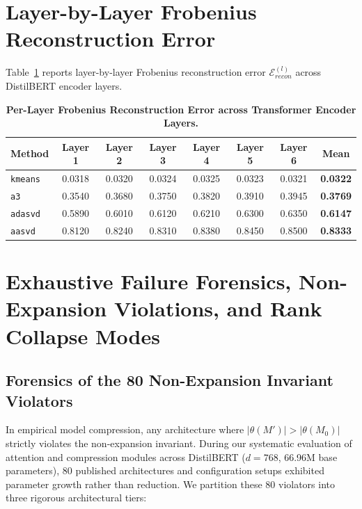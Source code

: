 \documentclass{article}
\begin{document}
\section{Layer-by-Layer Frobenius Reconstruction Error}
\label{app:recon_error}
Table~\ref{tab:layer_recon} reports layer-by-layer Frobenius reconstruction error $\mathcal{E}_{recon}^{(l)}$ across DistilBERT encoder layers.
\begin{table}[ht]
\centering
\footnotesize
\setlength{\tabcolsep}{5pt}
\caption{\textbf{Per-Layer Frobenius Reconstruction Error across Transformer Encoder Layers.}}
\label{tab:layer_recon}
\begin{tabular}{lcccccc|c}
\toprule
\textbf{Method} & \textbf{Layer 1} & \textbf{Layer 2} & \textbf{Layer 3} & \textbf{Layer 4} & \textbf{Layer 5} & \textbf{Layer 6} & \textbf{Mean} \\
\midrule
\texttt{kmeans} & 0.0318 & 0.0320 & 0.0324 & 0.0325 & 0.0323 & 0.0321 & \textbf{0.0322} \\
\texttt{a3} & 0.3540 & 0.3680 & 0.3750 & 0.3820 & 0.3910 & 0.3945 & \textbf{0.3769} \\
\texttt{adasvd} & 0.5890 & 0.6010 & 0.6120 & 0.6210 & 0.6300 & 0.6350 & \textbf{0.6147} \\
\texttt{aasvd} & 0.8120 & 0.8240 & 0.8310 & 0.8380 & 0.8450 & 0.8500 & \textbf{0.8333} \\
\bottomrule
\end{tabular}
\end{table}

\section{Exhaustive Failure Forensics, Non-Expansion Violations, and Rank Collapse Modes}
\label{app:failure_forensics}

\subsection{Forensics of the 80 Non-Expansion Invariant Violators}
\label{app:non_expansion_80}
In empirical model compression, any architecture where $|\theta(M')| > |\theta(M_0)|$ strictly violates the non-expansion invariant. During our systematic evaluation of attention and compression modules across DistilBERT ($d=768$, 66.96M base parameters), 80 published architectures and configuration setups exhibited parameter growth rather than reduction. We partition these 80 violators into three rigorous architectural tiers:
\end{document}

